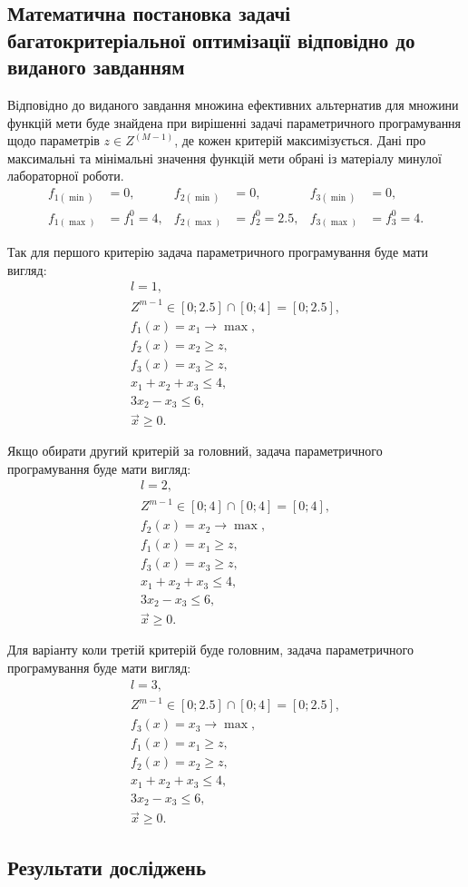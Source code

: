 \subsection{Математична постановка задачі багатокритеріальної оптимізації відповідно до виданого завданням}

Відповідно до виданого завдання множина ефективних альтернатив для множини функцій мети буде знайдена при вирішенні задачі параметричного програмування щодо параметрів $z \in Z^{(M-1)}$, де кожен критерій максимізується.
Дані про максимальні та мінімальні значення функцій мети обрані із матеріалу минулої лабораторної роботи.
\begin{align*}
    f_{1(\min)}&=0, &   f_{2(\min)}&=0, &   f_{3(\min)}&=0, \\
    f_{1(\max)}&=f_1^0=4,   &   f_{2(\max)}&=f_2^0=2.5, &   f_{3(\max)}&=f_3^0=4.
\end{align*} 

Так для першого критерію задача параметричного програмування буде мати вигляд:
\begin{gather*} 
    l = 1, \\
    Z^{m-1} \in [0; 2.5] \cap [0; 4] = [0; 2.5], \\
    f_1 (x) = x_1 \to \max, \\
    f_2 (x) = x_2 \geqslant z,  \\
    f_3 (x) = x_3 \geqslant z,  \\
    x_1 + x_2 + x_3 \leqslant 4, \\
    3 x_2 - x_3 \leqslant 6, \\
    \vec{x} \geqslant 0.
\end{gather*}

Якщо обирати другий критерій за головний, задача параметричного програмування буде мати вигляд:
\begin{gather*} 
    l = 2, \\
    Z^{m-1} \in [0; 4] \cap [0; 4] = [0; 4], \\
    f_2 (x) = x_2 \to \max, \\
    f_1 (x) = x_1 \geqslant z,  \\
    f_3 (x) = x_3 \geqslant z,  \\
    x_1 + x_2 + x_3 \leqslant 4, \\
    3 x_2 - x_3 \leqslant 6, \\
    \vec{x} \geqslant 0.
\end{gather*}

Для варіанту коли третій критерій буде головним, задача параметричного програмування буде мати вигляд:
\begin{gather*}
    l = 3, \\ 
    Z^{m-1} \in [0; 2.5] \cap [0; 4] = [0; 2.5], \\
    f_3 (x) = x_3 \to \max, \\
    f_1 (x) = x_1 \geqslant z,  \\
    f_2 (x) = x_2 \geqslant z,  \\
    x_1 + x_2 + x_3 \leqslant 4, \\
    3 x_2 - x_3 \leqslant 6, \\
    \vec{x} \geqslant 0.
\end{gather*}

\subsection{Результати досліджень}





